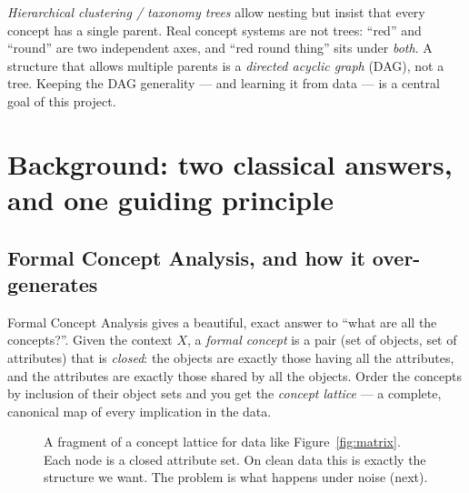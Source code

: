 \documentclass[11pt]{article}
\begin{document}
\emph{Hierarchical clustering / taxonomy trees} allow nesting but insist that
every concept has a single parent. Real concept systems are not trees: ``red''
and ``round'' are two independent axes, and ``red round thing'' sits under
\emph{both}. A structure that allows multiple parents is a \emph{directed
acyclic graph} (DAG), not a tree. Keeping the DAG generality --- and learning it
from data --- is a central goal of this project.

\section{Background: two classical answers, and one guiding principle}

\subsection{Formal Concept Analysis, and how it over-generates}

Formal Concept Analysis \cite{ganter1999} gives a beautiful, exact answer to
``what are all the concepts?''. Given the context $X$, a \emph{formal concept}
is a pair (set of objects, set of attributes) that is \emph{closed}: the objects
are exactly those having all the attributes, and the attributes are exactly
those shared by all the objects. Order the concepts by inclusion of their object
sets and you get the \emph{concept lattice} --- a complete, canonical map of
every implication in the data.

\begin{figure}[h]
\centering
{}
\caption{A fragment of a concept lattice for data like Figure~\ref{fig:matrix}.
Each node is a closed attribute set. On clean data this is exactly the structure
we want. The problem is what happens under noise (next).}
\label{fig:lattice}
\end{figure}
\end{document}
